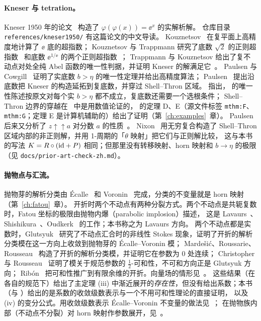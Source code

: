 \paragraph{Kneser 与 tetration。}
Kneser 1950 年的论文~\cite{Kneser1950} 构造了 $\varphi(\varphi(x))=\ee^x$ 的实解析解。
仓库目录 \texttt{references/kneser1950/} 有这篇论文的中文导读。
Kouznetsov~\cite{Kouznetsov2009} 在复平面上高精度地计算了 $\ee$ 底的超指数；
Kouznetsov 与 Trappmann 研究了底数 $\sqrt2$ 的正则超指数~\cite{KouznetsovTrappmann2010}
和底数 $\ee^{1/\ee}$ 的两个正则超指数~\cite{KouznetsovTrappmann2012}；
Trappmann 与 Kouznetsov 给出了复不动点对处全纯 Abel 函数的唯一性判据，并证明 Kneser 的解满足它~\cite{TrappmannKouznetsov2011}。
Paulsen 与 Cowgill~\cite{PaulsenCowgill2017} 证明了实底数 $b>\eta$ 的唯一性定理并给出高精度算法；
Paulsen~\cite{Paulsen2019} 提出沿底数把 Kneser 的构造延拓到复底数，并穿过 Shell--Thron 区域。
\cite[引言中关于 Paulsen 2019 的注]{KneserPaper} 指出，\cite[Prop.~2]{Paulsen2019} 的唯一性陈述按原文对每个实 $b>\eta$ 都不成立，复底数还需要一个选根条件；
Shell--Thron 边界的穿越在~\cite{Paulsen2019} 中是用数值论证的，\cite{KneserPaper} 的定理 D、E（源文件标签 \texttt{mthm:F}、\texttt{mthm:G}；定理 E 是计算机辅助的）给出了证明（第~\ref{ch:examples}~章）。
Paulsen 后来又分析了 $z\uparrow\uparrow a$ 对分数 $a$ 的性质~\cite{Paulsen2026}。
Nixon~\cite{Nixon2022} 用无穷复合构造了 Shell--Thron 区域内部的非正则解，并用 1-周期的「$\theta$ 映射」把它们与正则解比较，
这与本书的写法 $K=R\circ(\mathrm{id}+P)$ 相同；但那里没有转移映射、horn 映射和 $b\to\eta$ 的极限（见 \texttt{docs/prior-art-check-zh.md}）。

\paragraph{抛物点与汇流。}
抛物芽的解析分类由 Écalle~\cite{Ecalle1981} 和 Voronin~\cite{Voronin1981} 完成，分类的不变量就是 horn 映射（第~\ref{ch:fatou}~章）。
开折时两个不动点有两种分裂方式。两个不动点是共轭复数时，Fatou 坐标的极限由抛物内爆（parabolic implosion）描述，
这是 Lavaurs~\cite{Lavaurs1989}、Shishikura~\cite{Shishikura2000}、Oudkerk~\cite{Oudkerk1999} 的工作；本书称之为 Lavaurs 方向。
两个不动点都是实数时，Glutsyuk~\cite{Glutsyuk2001} 研究了不动点汇合时的非线性 Stokes 现象，证明了开折的解析分类模在这一方向上收敛到抛物芽的 Écalle--Voronin 模；
Mardešić、Roussarie、Rousseau~\cite{MRR2004} 构造了开折的解析分类模，并证明它在参数为 $0$ 处连续；
Christopher 与 Rousseau~\cite{ChristopherRousseau} 证明了模关于规范参数的 $\frac12$-可和性，不可和方向正是 Glutsyuk 方向；
Ribón~\cite{Ribon2010} 把可和性推广到有限余维的开折。向量场的情形见~\cite{RousseauTeyssier2008}。
这些结果（在各自的规范下）给出了主定理 (iii) 中渐近展开的\emph{存在性}，但没有给出系数；本书（与 \cite{KneserPaper}）给出的是系数的收敛级数表示与一个不用可和性理论的直接证明，
以及 (iv) 的变分公式。用收敛级数表示 Écalle--Voronin 不变量的做法见~\cite{DudkoSauzin2014}；
在抛物族内部（不动点不分裂）对 horn 映射作参数展开，见~\cite[Prop.~9.1]{BuffEcalleEpstein2013}。

